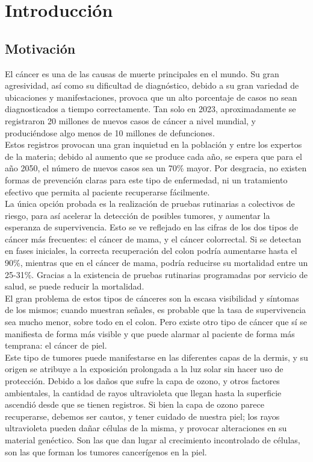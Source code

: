 \chapter{Introducción}

\section{Motivación}

El cáncer es una de las causas de muerte principales en el mundo. Su gran agresividad, así como su dificultad de diagnóstico, debido a su gran variedad de ubicaciones y manifestaciones, provoca que un alto porcentaje de casos no sean diagnosticados a tiempo correctamente. Tan solo en 2023, aproximadamente se registraron 20 millones de nuevos casos de cáncer a nivel mundial, y produciéndose algo menos de 10 millones de defunciones.\\

Estos registros provocan una gran inquietud en la población y entre los expertos de la materia; debido al aumento que se produce cada año, se espera que para el año 2050, el número de nuevos casos sea un 70\% mayor.  Por desgracia, no existen formas de prevención claras para este tipo de enfermedad, ni un tratamiento efectivo que permita al paciente recuperarse fácilmente. \\

La única opción probada es la realización de pruebas rutinarias a colectivos de riesgo, para así acelerar la detección de posibles tumores, y aumentar la esperanza de supervivencia. Esto se ve reflejado en las cifras de los dos tipos de cáncer más frecuentes: el cáncer de mama, y el cáncer colorrectal. Si se detectan en fases iniciales, la correcta recuperación del colon podría aumentarse hasta el 90\%, mientras que en el cáncer de mama, podría reducirse su mortalidad entre un 25-31\%. Gracias a la existencia de pruebas rutinarias programadas por servicio de salud, se puede reducir la mortalidad.\\

El gran problema de estos tipos de cánceres son la escasa visibilidad y síntomas de los mismos; cuando muestran señales, es probable que la tasa de supervivencia sea mucho menor, sobre todo en el colon. Pero existe otro tipo de cáncer que sí se manifiesta de forma más visible y que puede alarmar al paciente de forma más temprana: el cáncer de piel.\\

Este tipo de tumores puede manifestarse en las diferentes capas de la dermis, y su origen se atribuye a la exposición prolongada a la luz solar sin hacer uso de protección. Debido a los daños que sufre la capa de ozono, y otros factores ambientales, la cantidad de rayos ultravioleta que llegan hasta la superficie ascendió desde que se tienen registros. Si bien la capa de ozono parece recuperarse, debemos ser cautos, y tener cuidado de nuestra piel; los rayos ultravioleta pueden dañar células de la misma, y provocar alteraciones en su material genéctico. Son las que dan lugar al crecimiento incontrolado de células, son las que forman los tumores cancerígenos en la piel.\\

